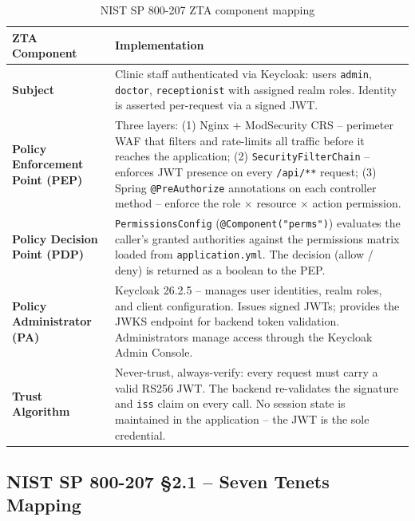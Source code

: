 \documentclass[12pt,a4paper]{report}
\begin{document}
\begin{table}[H]
\centering
\caption{NIST SP 800-207 ZTA component mapping}
\begin{tabularx}{\linewidth}{l X}
\toprule
\textbf{ZTA Component} & \textbf{Implementation} \\
\midrule
\textbf{Subject} &
  Clinic staff authenticated via Keycloak: users \texttt{admin}, \texttt{doctor},
  \texttt{receptionist} with assigned realm roles. Identity is asserted per-request
  via a signed JWT. \\[6pt]

\textbf{Policy Enforcement Point (PEP)} &
  Three layers: (1) Nginx + ModSecurity CRS -- perimeter WAF that filters and rate-limits
  all traffic before it reaches the application; (2) \texttt{SecurityFilterChain} -- enforces
  JWT presence on every \texttt{/api/**} request; (3) Spring \texttt{@PreAuthorize} annotations
  on each controller method -- enforce the role $\times$ resource $\times$ action permission. \\[6pt]

\textbf{Policy Decision Point (PDP)} &
  \texttt{PermissionsConfig} (\texttt{@Component("perms")}) evaluates the caller's
  granted authorities against the permissions matrix loaded from \texttt{application.yml}.
  The decision (allow / deny) is returned as a boolean to the PEP. \\[6pt]

\textbf{Policy Administrator (PA)} &
  Keycloak 26.2.5 -- manages user identities, realm roles, and client configuration.
  Issues signed JWTs; provides the JWKS endpoint for backend token validation.
  Administrators manage access through the Keycloak Admin Console. \\[6pt]

\textbf{Trust Algorithm} &
  Never-trust, always-verify: every request must carry a valid RS256 JWT. The
  backend re-validates the signature and \texttt{iss} claim on every call.
  No session state is maintained in the application -- the JWT is the sole credential. \\
\bottomrule
\end{tabularx}
\end{table}

\subsection{NIST SP 800-207 \S2.1 -- Seven Tenets Mapping}
\end{document}
